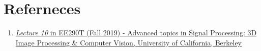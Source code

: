 \documentclass[10pt]{article}
\begin{document}
    \section*{\textbf{Referneces}}
    \begin{enumerate}
        \item \href{https://inst.eecs.berkeley.edu/~ee290t/fa19/lectures/lecture10-3-decomposing-
        F-matrix-into-Rotation-and-Translation.pdf}{\textit{Lecture 10} in EE290T (Fall 2019) -
        Advanced topics in Signal Processing: 3D Image Processing \& Computer Vision, University of
        California, Berkeley}
    \end{enumerate}
\end{document}
